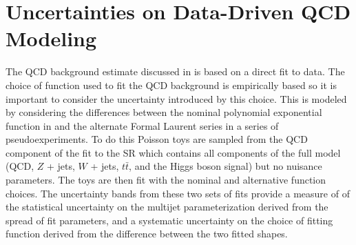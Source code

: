 \section{Uncertainties on Data-Driven QCD Modeling} \label{sec:systematics:qcd_modeling}

The QCD background estimate discussed in  is based on
a direct fit to data. The choice of function used to fit the QCD background is
empirically based so it is important to consider the uncertainty introduced by
this choice.  This is modeled by considering the differences between the
nominal polynomial exponential function in  and
the alternate Formal Laurent series  in a series
of pseudoexperiments.  To do this Poisson toys are sampled from the QCD
component of the fit to the SR which contains all components of the full model
(QCD, $Z$ + jets, $W$ + jets, $t\bar{t}$, and the Higgs boson signal) but no
nuisance parameters. The toys are then fit with the nominal and alternative
function choices.  The uncertainty bands from these two sets of fits provide a
measure of of the statistical uncertainty on the multijet parameterization
derived from the spread of fit parameters, and a systematic uncertainty on the
choice of fitting function derived from the difference between the two fitted
shapes.
